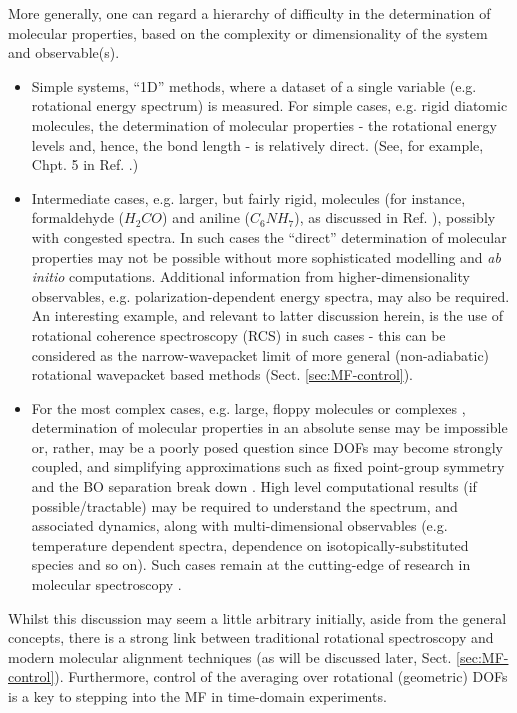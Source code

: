 \documentclass[10pt]{article}
\begin{document}
More generally, one can regard a hierarchy of difficulty in the determination of molecular properties, based on the complexity or dimensionality of the system and observable(s).
\begin{itemize}
\item Simple systems, ``1D” methods, where a dataset of a single variable (e.g. rotational energy spectrum) is measured. For simple cases, e.g. rigid diatomic molecules, the determination of molecular properties - the rotational energy levels and, hence, the bond length - is relatively direct. (See, for example, Chpt. 5 in Ref. \cite{hollasHighRes}.) %
\item Intermediate cases, e.g. larger, but fairly rigid, molecules (for instance, formaldehyde ($H_2CO$) and aniline ($C_6NH_7$), as discussed in Ref. \cite{hollasHighRes}), possibly with congested spectra. In such cases the ``direct” determination of molecular properties may not be possible without more sophisticated modelling and \textit{ab initio} computations. Additional information from higher-dimensionality observables, e.g. polarization-dependent energy spectra, may also be required. An interesting example, and relevant to latter discussion herein, is the use of rotational coherence spectroscopy (RCS) in such cases \cite{Felker1987} - this can be considered as the narrow-wavepacket limit of more general (non-adiabatic) rotational wavepacket based methods (Sect. \ref{sec:MF-control}).
\item For the most complex cases, e.g. large, floppy molecules or complexes \cite{bunkerMolSymm,schmiedt2015SymmetryExtremelyFloppy}, determination of molecular properties in an absolute sense may be impossible or, rather, may be a poorly posed question since DOFs may become strongly coupled, and simplifying approximations such as fixed point-group symmetry and the BO separation break down \cite{bunkerMolSymm}. High level computational results (if possible/tractable) may be required to understand the spectrum, and associated dynamics, along with multi-dimensional observables (e.g. temperature dependent spectra, dependence on isotopically-substituted species and so on). Such cases remain at the cutting-edge of research in molecular spectroscopy \cite{schmiedt2015SymmetryExtremelyFloppy}.
\end{itemize}    

Whilst this discussion may seem a little arbitrary initially, aside from the general concepts, there is a strong link between traditional rotational spectroscopy and modern molecular alignment techniques (as will be discussed later, Sect. \ref{sec:MF-control}). Furthermore, control of the averaging over rotational (geometric) DOFs is a key to stepping into the MF in time-domain experiments.
\end{document}
